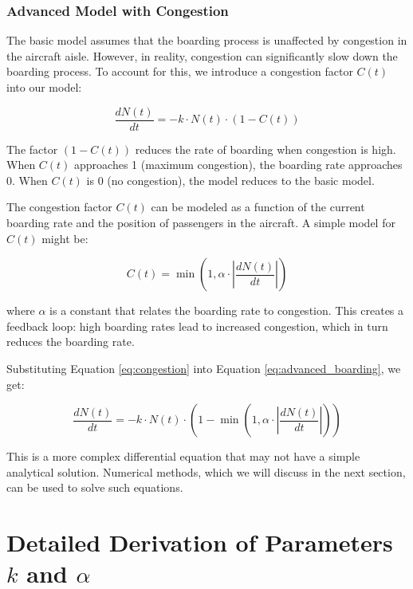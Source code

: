 \documentclass[12pt,a4paper]{article}
\begin{document}
\subsubsection{Advanced Model with Congestion}

The basic model assumes that the boarding process is unaffected by congestion in the aircraft aisle. However, in reality, congestion can significantly slow down the boarding process. To account for this, we introduce a congestion factor $C(t)$ into our model:

\begin{equation}
\frac{dN(t)}{dt} = -k \cdot N(t) \cdot (1 - C(t))
\label{eq:advanced_boarding}
\end{equation}

The factor $(1 - C(t))$ reduces the rate of boarding when congestion is high. When $C(t)$ approaches 1 (maximum congestion), the boarding rate approaches 0. When $C(t)$ is 0 (no congestion), the model reduces to the basic model.

The congestion factor $C(t)$ can be modeled as a function of the current boarding rate and the position of passengers in the aircraft. A simple model for $C(t)$ might be:

\begin{equation}
C(t) = \min\left(1, \alpha \cdot \left| \frac{dN(t)}{dt} \right| \right)
\label{eq:congestion}
\end{equation}

where $\alpha$ is a constant that relates the boarding rate to congestion. This creates a feedback loop: high boarding rates lead to increased congestion, which in turn reduces the boarding rate.

Substituting Equation \ref{eq:congestion} into Equation \ref{eq:advanced_boarding}, we get:

\begin{equation}
\frac{dN(t)}{dt} = -k \cdot N(t) \cdot \left(1 - \min\left(1, \alpha \cdot \left| \frac{dN(t)}{dt} \right| \right) \right)
\label{eq:combined_boarding}
\end{equation}

This is a more complex differential equation that may not have a simple analytical solution. Numerical methods, which we will discuss in the next section, can be used to solve such equations.

\section{Detailed Derivation of Parameters $k$ and $\alpha$}
\end{document}
